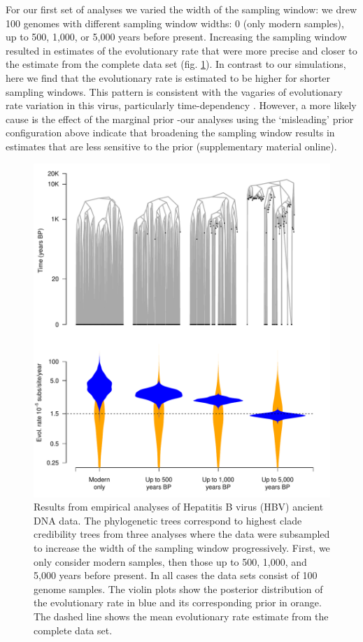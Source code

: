 \documentclass[11pt]{article}
\begin{document}
For our first set of analyses we varied the width of the sampling window: we drew 100 genomes with different sampling window widths: 0 (only modern samples), up to 500, 1,000, or 5,000 years before present. Increasing the sampling window resulted in estimates of the evolutionary rate that were more precise and closer to the estimate from the complete data set (fig. \ref{figure:Fig6}). In contrast to our simulations, here we find that the evolutionary rate is estimated to be higher for shorter sampling windows. This pattern is consistent with the vagaries of evolutionary rate variation in this virus, particularly time-dependency \citep{vrancken2017accurate}. However, a more likely cause is the effect of the marginal prior -our analyses using the `misleading' prior configuration above indicate that broadening the sampling window results in estimates that are less sensitive to the prior (supplementary material online).

\begin{figure}[H]
    \begin{center}
        \includegraphics[scale=0.7, angle=0]{empirical_results_depth.pdf}
        \caption{Results from empirical analyses of Hepatitis B virus (HBV) ancient DNA data. The phylogenetic trees correspond to highest clade credibility trees from three analyses where the data were subsampled to increase the width of the sampling window progressively. First, we only consider modern samples, then those up to 500, 1,000, and 5,000 years before present. In all cases the data sets consist of 100 genome samples. The violin plots show the posterior distribution of the evolutionary rate in blue and its corresponding prior in orange. The dashed line shows the mean evolutionary rate estimate from the complete data set.}
        \label{figure:Fig6}
    \end{center}
\end{figure}
\end{document}
